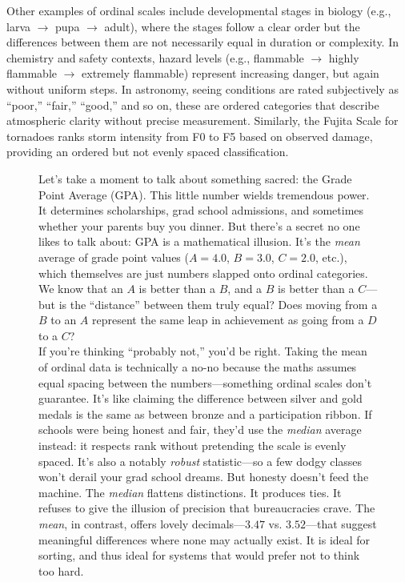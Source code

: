 Other examples of ordinal scales include developmental stages in biology (e.g., larva $\rightarrow$ pupa $\rightarrow$ adult), where the stages follow a clear order but the differences between them are not necessarily equal in duration or complexity. In chemistry and safety contexts, hazard levels (e.g., flammable $\rightarrow$ highly flammable $\rightarrow$ extremely flammable) represent increasing danger, but again without uniform steps. In astronomy, seeing conditions are rated subjectively as ``poor,'' ``fair,'' ``good,'' and so on, these are ordered categories that describe atmospheric clarity without precise measurement. Similarly, the Fujita Scale for tornadoes ranks storm intensity from F0 to F5 based on observed damage, providing an ordered but not evenly spaced classification.

\begin{figure}[htpb]
\hypertarget{box:gpa_illusion}{}
\begin{mdframed}[nobreak = true, style = miscFrame, frametitle = \Large\IMFellEnglish Box 4.1: The GPA Illusion]
\IMFellEnglish
\begin{spacing}{1.25}
Let’s take a moment to talk about something sacred: the Grade Point Average (GPA). This little number wields tremendous power. It determines scholarships, grad school admissions, and sometimes whether your parents buy you dinner. But there’s a secret no one likes to talk about: GPA is a mathematical illusion. It’s the \textit{mean} average of grade point values ($A = 4.0$, $B = 3.0$, $C = 2.0$, etc.), which themselves are just numbers slapped onto ordinal categories. We know that an $A$ is better than a $B$, and a $B$ is better than a $C$—but is the \enquote{distance} between them truly equal? Does moving from a $B$ to an $A$ represent the same leap in achievement as going from a $D$ to a $C$? \\

If you’re thinking \enquote{probably not,} you'd be right. Taking the mean of ordinal data is technically a no-no because the maths assumes equal spacing between the numbers—something ordinal scales don’t guarantee. It's like claiming the difference between silver and gold medals is the same as between bronze and a participation ribbon. If schools were being honest and fair, they'd use the \textit{median} average instead: it respects rank without pretending the scale is evenly spaced. It's also a notably \textit{robust} statistic—so a few dodgy classes won't derail your grad school dreams. But honesty doesn’t feed the machine. The \textit{median} flattens distinctions. It produces ties. It refuses to give the illusion of precision that bureaucracies crave. The \textit{mean}, in contrast, offers lovely decimals—$3.47$ vs. $3.52$—that suggest meaningful differences where none may actually exist. It is ideal for sorting, and thus ideal for systems that would prefer not to think too hard. \\


\end{spacing}
\end{mdframed}
\end{figure}
